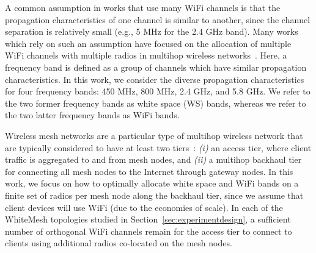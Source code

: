 %

A common assumption in works that use many WiFi channels is that the
propagation characteristics of one channel is similar to another, 
since the channel separation is relatively small (e.g., 5 MHz for 
the 2.4 GHz band).
Many works which rely on such an assumption have focused on the 
allocation of multiple WiFi channels with multiple radios in 
multihop wireless networks~\cite{si2010overview}.  Here, a frequency 
band is defined as a group of channels which have
similar propagation characteristics.
In this work, we consider the diverse propagation characteristics
for four frequency bands: 450 MHz, 800 MHz, 2.4 GHz, and 5.8 GHz.
We refer to the two former frequency bands as white space (WS) bands, whereas
we refer to the two latter frequency bands as WiFi bands.

Wireless mesh networks are a particular type of multihop wireless network
that are typically considered to have at least two
tiers~\cite{CRSK06}: {\it (i)} an access tier, where client traffic 
is aggregated to and from mesh nodes, and {\it (ii)} a multihop 
backhaul tier for connecting all mesh nodes to the Internet through 
gateway nodes. In this work, we focus on how to optimally allocate 
white space and WiFi bands on a finite set of radios per mesh node
along the backhaul tier, since we assume that client devices will use 
WiFi (due to the economies of scale).  In each of the WhiteMesh 
topologies studied in Section~\ref{sec:experimentdesign}, a sufficient 
number of orthogonal WiFi channels remain for the access tier to 
connect to clients using additional radios co-located on the mesh nodes.


